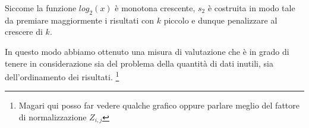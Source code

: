 Siccome la funzione $log_2(x)$ è monotona crescente, $s_2$ è costruita in modo tale da
premiare maggiormente i risultati con $k$ piccolo e dunque penalizzare al crescere di $k$.

In questo modo abbiamo ottenuto una misura di valutazione che è in grado di tenere in considerazione
sia del problema della quantità di dati inutili, sia dell'ordinamento dei risultati. \footnote{Magari qui posso far vedere qualche grafico oppure parlare meglio del fattore di normalizzazione $Z_{i,j}$}

